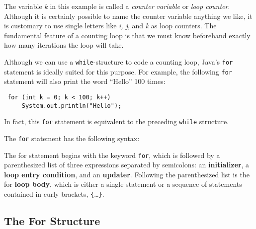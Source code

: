 The variable {\it k} in this example is called a
{\it counter variable} or {\it loop counter}.  Although it is
certainly possible to name the counter variable anything we like, it
is customary to use single letters like {\it i, j}, and {\it k} as
loop counters.  The fundamental feature of a counting loop is that we
must know beforehand exactly how many iterations the loop will take.


\noindent Although we can use a {\tt while}-structure to
code a counting loop, Java's {\tt for} statement is ideally suited for
this purpose.  For example, the following {\tt for} statement will also
print the word ``Hello'' 100 times:

\begin{jjjlisting}
\begin{lstlisting}
 for (int k = 0; k < 100; k++)
     System.out.println("Hello");
\end{lstlisting}
\end{jjjlisting}

\noindent In fact, this {\tt for} statement is equivalent
to the preceding {\tt while} structure. 

The {\tt for} statement has the following syntax:


\noindent The for statement begins with the keyword {\tt for}, which
is followed by a parenthesized list of three expressions separated by
semicolons: an {\bf initializer}, a {\bf loop entry condition}, and an
{\bf updater}.  Following the parenthesized list is the for {\bf loop
body}, which is either a single statement or a sequence of statements
contained in curly brackets, \verb|{|\dots\verb|}|.

\subsection{The For Structure}
\begin{figure}[tb]
\end{figure}

